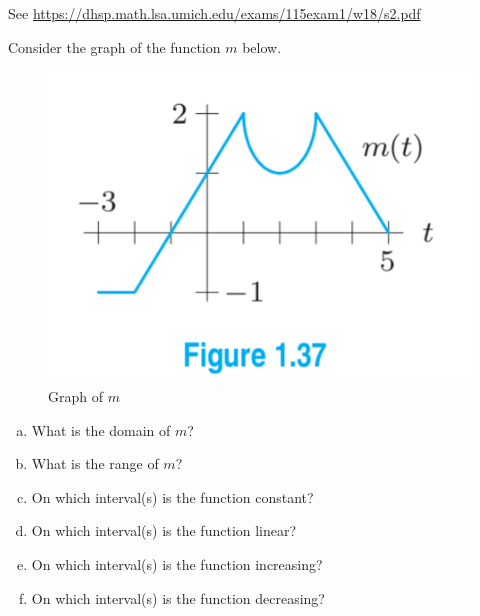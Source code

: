 \documentclass[11pt]{exam}
\begin{document}
\begin{questions}
  \begin{solution}
    See \href{https://dhsp.math.lsa.umich.edu/exams/115exam1/w18/s2.pdf}{https://dhsp.math.lsa.umich.edu/exams/115exam1/w18/s2.pdf}
  \end{solution}
  \question 
Consider the graph of the function $m$ below.
\begin{figure}[h]
\centering
\includegraphics[scale=0.5]{Figures/fig1.pdf}
\caption{Graph of $m$}
\end{figure}
\begin{enumerate}[(a)]

\item What is the domain of $m$?

\item What is the range of $m$?

\item On which interval(s) is the function constant?

\item On which interval(s) is the function linear?

\item On which interval(s) is the function increasing?

\item On which interval(s) is the function decreasing?


\end{enumerate}
\end{questions}
\end{document}
